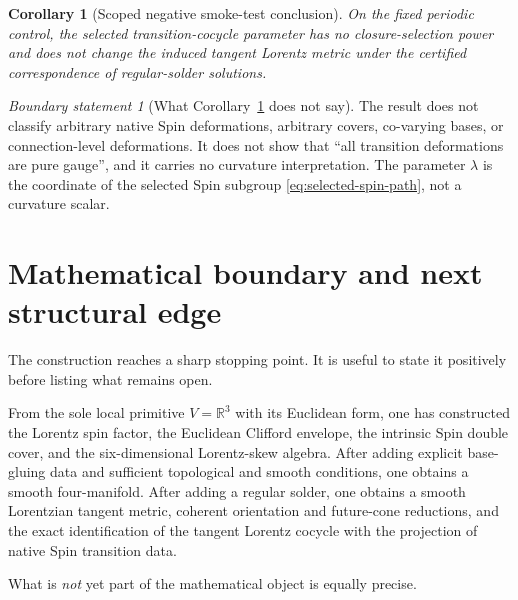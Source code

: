 \documentclass[11pt,a4paper]{article}
\newtheorem{corollary}[theorem]{Corollary}
\theoremstyle{definition}
\theoremstyle{remark}
\newtheorem{boundary}[theorem]{Boundary statement}
\newcommand{\R}{\mathbb{R}}
\begin{document}
\begin{corollary}[Scoped negative smoke-test conclusion]
\label{cor:smoketest}
On the fixed periodic control, the selected transition-cocycle parameter
has no closure-selection power and does not change the induced tangent
Lorentz metric under the certified correspondence of regular-solder
solutions.
\end{corollary}

\begin{boundary}[What Corollary~\ref{cor:smoketest} does not say]
The result does not classify arbitrary native Spin deformations, arbitrary
covers, co-varying bases, or connection-level deformations.  It does not
show that ``all transition deformations are pure gauge'', and it carries no
curvature interpretation.  The parameter \(\lambda\) is the coordinate of
the selected Spin subgroup \eqref{eq:selected-spin-path}, not a curvature scalar.
\end{boundary}

\clearpage
\section{Mathematical boundary and next structural edge}
\label{sec:boundary}

The construction reaches a sharp stopping point.  It is useful to state it
positively before listing what remains open.

From the sole local primitive \(V=\R^{3}\) with its Euclidean form, one has
constructed the Lorentz spin factor, the Euclidean Clifford envelope, the
intrinsic Spin double cover, and the six-dimensional Lorentz-skew algebra.
After adding explicit base-gluing data and sufficient topological and smooth
conditions, one obtains a smooth four-manifold.  After adding a regular
solder, one obtains a smooth Lorentzian tangent metric, coherent
orientation and future-cone reductions, and the exact identification of
the tangent Lorentz cocycle with the projection of native Spin transition
data.

What is \emph{not} yet part of the mathematical object is equally precise.
\end{document}
